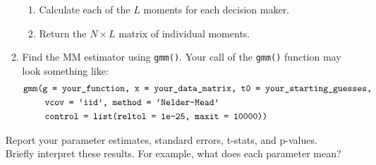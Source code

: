 \documentclass[11pt,letterpaper]{article}\usepackage[]{graphicx}\usepackage[]{color}
\begin{document}
\begin{enumerate}[label=\alph*., leftmargin=*]
\begin{enumerate}[label=\Roman*.]
\begin{enumerate}[label=\roman*.]
			\item Calculate each of the $L$ moments for each decision maker.
			\item Return the $N \times L$ matrix of individual moments.
		\end{enumerate}
		\item Find the MM estimator using \texttt{gmm()}. Your call of the \texttt{gmm()} function may look something like:
		\begin{align*}
			&\text{\texttt{gmm(g = your\_function, x = your\_data\_matrix, t0 = your\_starting\_guesses, }} \\
			&\qquad~ \text{\texttt{vcov = `iid', method = `Nelder-Mead'}} \\
			&\qquad~ \text{\texttt{control = list(reltol = 1e-25, maxit = 10000))}}
		\end{align*}
	\end{enumerate}
	Report your parameter estimates, standard errors, t-stats, and p-values. Briefly interpret these results. For example, what does each parameter mean?


\end{enumerate}
\end{document}
